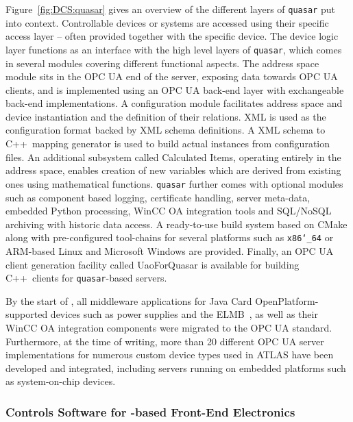 \documentclass[cernpreprint, atlasdraft=false, UKenglish,british,orcidlogo, texmf, orcidlogo]{atlasdoc}
\begin{document}
Figure~\ref{fig:DCS:quasar} gives an overview of the different layers
of \texttt{\gls{quasar}} put into context. Controllable devices or
systems are accessed using their specific access layer -- often
provided together with the specific device.  The device logic layer
functions as an interface with the high level layers of
\texttt{\gls{quasar}}, which comes in several modules covering
different functional aspects.  The address space module sits in the
\gls{OPC UA}  end of the server, exposing data towards \gls{OPC UA}
clients, and is implemented using an \gls{OPC UA}  back-end layer with
exchangeable back-end implementations. A configuration module
facilitates address space and device instantiation and the definition
of their relations.  \gls{XML} is used as the configuration format backed by
\gls{XML} schema definitions. A  \gls{XML} schema to C++\ mapping generator is used to build actual instances from configuration files.  An additional subsystem called Calculated Items, operating entirely in the address space, enables creation of new variables which are derived from existing ones using mathematical
functions. \texttt{\gls{quasar}} further comes with optional modules
such as component based logging, certificate handling, server
meta-data, embedded Python processing, \gls{WinCC OA} integration
tools and \gls{SQL}/\gls{NoSQL} archiving with historic data access. A
ready-to-use build system based on CMake along with pre-configured
tool-chains for several platforms such as \texttt{x86\char`_64} or
ARM-based Linux and Microsoft Windows are provided. Finally, an
\gls{OPC UA}  client generation facility called UaoForQuasar is
available for building C++\ clients for \texttt{\gls{quasar}}-based
servers.
 
By the start of \RunThr, all middleware applications for Java Card OpenPlatform-supported devices such as power supplies and the \gls{ELMB}~\cite{ELMB}, as well as their \gls{WinCC OA} integration components were migrated to the \gls{OPC UA}  standard. Furthermore, at the time of writing, more than 20 different \gls{OPC UA}  server implementations for numerous custom device types used in ATLAS have been developed and integrated, including servers running on embedded platforms such as system-on-chip devices.
 
\subsubsection{Controls Software for -based Front-End Electronics}
\label{TDAQ_DCS_GBT_SCA}
 
\end{document}

